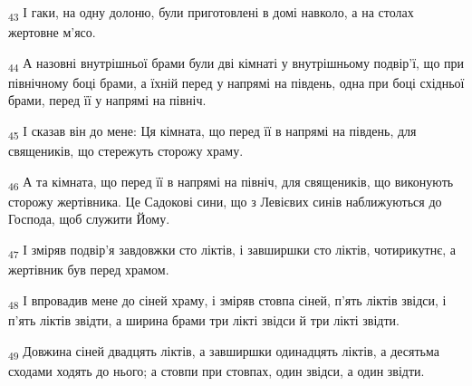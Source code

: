\begin{tcolorbox}
\textsubscript{43} І гаки, на одну долоню, були приготовлені в домі навколо, а на столах жертовне м'ясо.
\end{tcolorbox}
\begin{tcolorbox}
\textsubscript{44} А назовні внутрішньої брами були дві кімнаті у внутрішньому подвір'ї, що при північному боці брами, а їхній перед у напрямі на південь, одна при боці східньої брами, перед її у напрямі на північ.
\end{tcolorbox}
\begin{tcolorbox}
\textsubscript{45} І сказав він до мене: Ця кімната, що перед її в напрямі на південь, для священиків, що стережуть сторожу храму.
\end{tcolorbox}
\begin{tcolorbox}
\textsubscript{46} А та кімната, що перед її в напрямі на північ, для священиків, що виконують сторожу жертівника. Це Садокові сини, що з Левієвих синів наближуються до Господа, щоб служити Йому.
\end{tcolorbox}
\begin{tcolorbox}
\textsubscript{47} І зміряв подвір'я завдовжки сто ліктів, і завширшки сто ліктів, чотирикутнє, а жертівник був перед храмом.
\end{tcolorbox}
\begin{tcolorbox}
\textsubscript{48} І впровадив мене до сіней храму, і зміряв стовпа сіней, п'ять ліктів звідси, і п'ять ліктів звідти, а ширина брами три лікті звідси й три лікті звідти.
\end{tcolorbox}
\begin{tcolorbox}
\textsubscript{49} Довжина сіней двадцять ліктів, а завширшки одинадцять ліктів, а десятьма сходами ходять до нього; а стовпи при стовпах, один звідси, а один звідти.
\end{tcolorbox}
